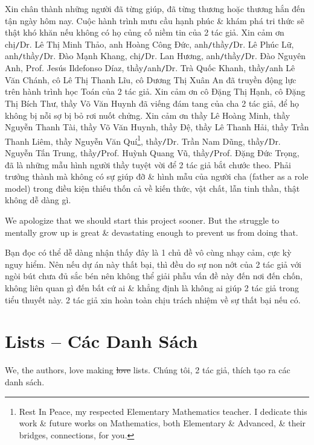 \documentclass[12pt]{article}
\begin{document}
Xin chân thành những người đã từng giúp, đã từng thương hoặc thương hắn đến tận ngày hôm nay. Cuộc hành trình mưu cầu hạnh phúc \& khám phá tri thức sẽ thật khó khăn nếu không có họ củng cố niềm tin của 2 tác giả. Xin cảm ơn chị{\tt/}Dr. {\sc Lê Thị Minh Thảo}, anh {\sc Hoàng Công Đức}, anh{\tt/}thầy{\tt/}Dr. {\sc Lê Phúc Lữ}, anh{\tt/}thầy{\tt/}Dr.  {\sc Đào Mạnh Khang}, chị{\tt/}Dr.  {\sc Lan Hương}, anh{\tt/}thầy{\tt/}Dr.  {\sc Đào Nguyên Anh}, Prof. {\sc Jesús Ildefonso Díaz}, thầy{\tt/}anh{\tt/}Dr.  {\sc Trà Quốc Khanh}, thầy{\tt/}anh {\sc Lê Văn Chánh}, cô {\sc Lê Thị Thanh Lĩu}, cô {\sc Dương Thị Xuân An} đã truyền động lực trên hành trình học Toán của 2 tác giả. Xin cảm ơn cô {\sc Đặng Thị Hạnh}, cô {\sc Đặng Thị Bích Thư}, thầy {\sc Võ Văn Huynh} đã viếng đám tang của cha 2 tác giả, để họ không bị nỗi sợ bị bỏ rơi nuốt chửng. Xin cảm ơn thầy {\sc Lê Hoàng Minh}, thầy {\sc Nguyễn Thanh Tài}, thầy {\sc Võ Văn Huynh}, thầy {\sc Đệ}, thầy {\sc Lê Thanh Hải}, thầy {\sc Trần Thanh Liêm}, thầy {\sc Nguyễn Văn Quí}\footnote{Rest In Peace, my respected Elementary Mathematics teacher. I dedicate this work \& future works on Mathematics, both Elementary \& Advanced, \& their bridges, connections, for you.}, thầy{\tt/}Dr.  {\sc Trần Nam Dũng}, thầy{\tt/}Dr. {\sc Nguyễn Tấn Trung}, thầy{\tt/}Prof. {\sc Huỳnh Quang Vũ}, thầy{\tt/}Prof. {\sc Đặng Đức Trọng}, đã là những mẫu hình người thầy tuyệt vời để 2 tác giả bắt chước theo. Phải trưởng thành mà không có sự giúp đỡ \& hình mẫu của người cha (father as a role model) trong điều kiện thiếu thốn cả về kiến thức, vật chất, lẫn tinh thần, thật không dễ dàng gì.

We apologize that we should start this project sooner. But the struggle to mentally grow up is great \& devastating enough to prevent us from doing that.

Bạn đọc có thể dễ dàng nhận thấy đây là 1 chủ đề vô cùng nhạy cảm, cực kỳ nguy hiểm. Nên nếu dự án này thất bại, thì đều do sự non nớt của 2 tác giả với ngòi bút chưa đủ sắc bén nên không thể giải phẫu vấn đề này đến nơi đến chốn, không liên quan gì đến bất cứ ai \& khẳng định là không ai giúp 2 tác giả trong tiểu thuyết này. 2 tác giả xin hoàn toàn chịu trách nhiệm về sự thất bại nếu có.


\section{Lists -- Các Danh Sách}
We, the authors, love making \st{love} lists. Chúng tôi, 2 tác giả, thích tạo ra các danh sách.
\end{document}
